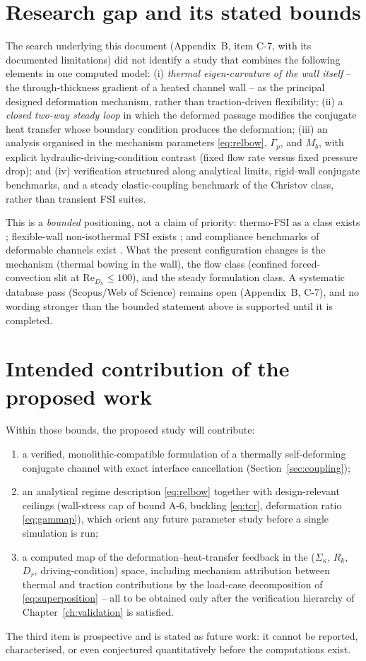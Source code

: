 \section{Research gap and its stated bounds}
The search underlying this document (Appendix~B, item C-7, with its documented limitations) did not
identify a study that combines the following elements in one computed model:
(i) \emph{thermal eigen-curvature of the wall itself} -- the through-thickness gradient of a heated
channel wall -- as the principal designed deformation mechanism, rather than traction-driven
flexibility;
(ii) a \emph{closed two-way steady loop} in which the deformed passage modifies the conjugate heat
transfer whose boundary condition produces the deformation;
(iii) an analysis organised in the mechanism parameters \eqref{eq:relbow}, $\Gamma_p$, and $M_b$,
with explicit hydraulic-driving-condition contrast (fixed flow rate versus fixed pressure drop);
and (iv) verification structured along analytical limits, rigid-wall conjugate benchmarks, and a
steady elastic-coupling benchmark of the Christov class, rather than transient FSI suites.

This is a \emph{bounded} positioning, not a claim of priority: thermo-FSI as a class exists
\cite{kumar2026thermo}; flexible-wall non-isothermal FSI exists
\cite{soti2015steady,alsabery2019numerical,saleh2025laminar}; and compliance benchmarks of
deformable channels exist \cite{christov2018flow}. What the present configuration changes is the
mechanism (thermal bowing in the wall), the flow class (confined forced-convection slit at
$\mathrm{Re}_{D_h}\le100$), and the steady formulation class. A systematic database pass
(Scopus/Web of Science) remains open (Appendix~B, C-7), and no wording stronger than the bounded
statement above is supported until it is completed.

\section{Intended contribution of the proposed work}
Within those bounds, the proposed study will contribute:
\begin{enumerate}\itemsep1pt
\item a verified, monolithic-compatible formulation of a thermally self-deforming conjugate
channel with exact interface cancellation (Section~\ref{sec:coupling});
\item an analytical regime description \eqref{eq:relbow} together with design-relevant ceilings
(wall-stress cap of bound A-6, buckling \eqref{eq:tcr}, deformation ratio \eqref{eq:gammap}),
which orient any future parameter study before a single simulation is run;
\item a computed map of the deformation--heat-transfer feedback in the ($\Sigma_\kappa$, $R_k$,
$D_r$, driving-condition) space, including mechanism attribution between thermal and traction
contributions by the load-case decomposition of \eqref{eq:superposition} -- all to be obtained
only after the verification hierarchy of Chapter~\ref{ch:validation} is satisfied.
\end{enumerate}
The third item is prospective and is stated as future work: it cannot be reported, characterised,
or even conjectured quantitatively before the computations exist.
